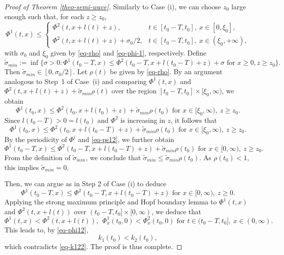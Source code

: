 \documentclass[11pt]{amsart}
\numberwithin{equation}{section}
\begin{document}
\begin{proof}[Proof of Theorem \ref{theo-semi-wave}]
Similarly to Case (i),  we can choose $z_0$ large enough such that,   for each $ z\geq z_0 $,
\begin{equation}\label{eq-ps12}
  \Phi^1(t,x)\leq \begin{cases}
    \Phi^2(t,x+l(t)+z), &t\in[t_0-T,t_0],\  x\in[0,\xi_0],\\
    \Phi^2(t,x+l(t)+z)+\sigma_0/2, &t\in[t_0-T,t_0],\ x\in(\xi_0, +\infty),
  \end{cases}
\end{equation}
with  $\sigma_0$ and $\xi_0$  given by \eqref{eq-rho} and \eqref{eq-phi-1}, respectively.
Define 
\begin{equation*}
  \tilde{\sigma}_{min}:=\inf\{\sigma>0:  \Phi^1(t_0-T,x)\leq \Phi^2(t_0-T,x+l(t_0-T)+z)+\sigma \text{ for }x\geq 0, z\geq z_0\}.
\end{equation*}
Then $\tilde{\sigma}_{min}\in[0,\sigma_0/2]$.
Let $\rho(t)$ be  given by \eqref{eq-rho}. By an argument analogous to Step~1 of Case~(i) and comparing  $\Phi^1(t,x)$ and $\Phi^2(t,x+l(t)+z)+\tilde{\sigma}_{min}\rho(t)$ over the region   $[t_0-T,t_0]\times[\xi_0,\infty)$, we obtain 
 \begin{equation*}
  \Phi^1(t_0,x)\leq \Phi^2(t_0,x+l(t_0)+z)+\tilde{\sigma}_{min}\rho(t_0)  \text{ for } x\in [\xi_0,\infty),\ z\geq z_0.
\end{equation*}
Since $l(t_0-T)>0=l(t_0)$ and $\Phi^2$ is increasing in $z$,  it follows that 
  \begin{equation*}
  \Phi^1(t_0,x)\leq \Phi^2(t_0,x+l(t_0-T)+z)+\tilde{\sigma}_{min}\rho(t_0)   \text{ for } x\in [\xi_0,\infty),\ z\geq z_0.
\end{equation*}
By  the periodicity of $\Phi^{i}$ and  \eqref{eq-ps12}, we further obtain
 \begin{equation*}
  \Phi^1(t_0-T,x)\leq \Phi^2(t_0-T,x+l(t_0-T)+z)+\tilde{\sigma}_{min} \rho(t_0)  \text{ for } x\in [0,\infty),\ z\geq z_0.
\end{equation*}
From the definition of $\tilde{\sigma}_{min}$, we conclude that $\tilde{\sigma}_{min}\leq \tilde{\sigma}_{min}\rho(t_0)$. As $\rho(t_0)<1$, this implies $\tilde{\sigma}_{min}=0$.

Then, we can argue as in Step 2 of Case (i) to deduce
 \begin{equation}\label{eq-piz12}
  \Phi^1(t_0-T,x)\leq \Phi^2(t_0-T,x+l(t_0-T)+z) \text{ for } x\in [0,\infty),\ z\geq 0.
\end{equation}
Applying the strong maximum principle and Hopf boundary lemma to $\Phi^1(t,x)$ and  $\Phi^2(t,x+l(t))$ over $(t_0-T,t_0]\times [0,\infty)$, we  deduce that 
 \begin{equation*}
  \Phi^1(t,x)< \Phi^2(t,x+l(t)), ~~ \Phi^1_x(t_0,0)<\Phi^2_x(t_0,0) \text{ for }t\in(t_0-T,t_0],\ x\in (0,\infty).
\end{equation*}
This leads to, by \eqref{eq-phi12}, 
\begin{equation*}
  k_1(t_0)<k_2(t_0),
\end{equation*}
 which contradicts \eqref{eq-k122}. The proof is thus complete.
\end{proof}
\end{document}
